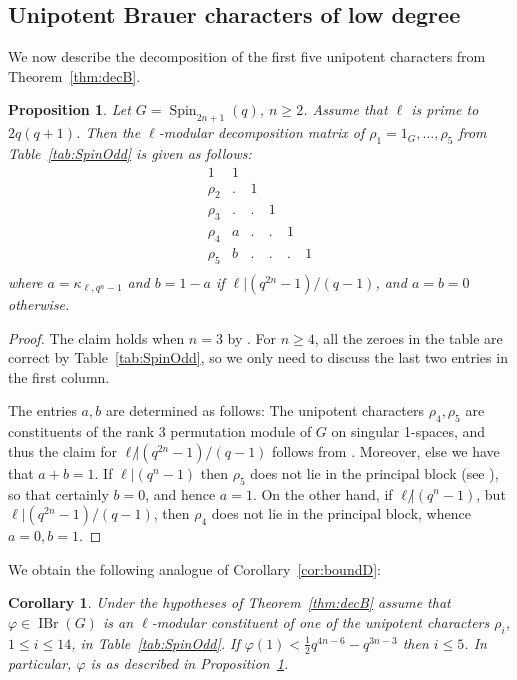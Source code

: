 \documentclass[12pt,leqno,a4paper]{amsart}
\newcommand{\IBr}{{\operatorname{IBr}}}
\newcommand{\Spin}{{\operatorname{Spin}}}
\newcommand{\hlf}{\frac{1}{2}}
\let\vhi=\varphi
\newtheorem{prop}[thm]{Proposition}
\newtheorem{cor}[thm]{Corollary}
\theoremstyle{remark}
\begin{document}
\subsection{Unipotent Brauer characters of low degree}

We now describe the decomposition of the first five unipotent characters
from Theorem~\ref{thm:decB}.

\begin{prop}   \label{prop:decmatBn}
 Let $G=\Spin_{2n+1}(q)$, $n\ge2$. Assume that  $\ell$ is prime to $2q(q+1)$.
 Then the $\ell$-modular decomposition matrix of $\rho_1=1_G,\ldots,\rho_5$
 from Table~\ref{tab:SpinOdd} is given as follows:
 \[\begin{array}{l|lllll}
       1& 1\\
  \rho_2& .& 1\\
  \rho_3& .& .& 1\\
  \rho_4& a& .& .& 1\\
  \rho_5& b& .& .& .& 1\\
 \end{array}\]
 where $a=\kappa_{\ell,q^n-1}$ and $b=1-a$ if $\ell|(q^{2n}-1)/(q-1)$, and
 $a=b=0$ otherwise.
\end{prop}

\begin{proof}
The claim holds when $n=3$ by \cite{HN14}. For $n\ge4$, all the zeroes in the
table are correct by Table~\ref{tab:SpinOdd}, so we only need to discuss the
last two entries in the first column. \par
The entries $a,b$ are determined as follows: The unipotent characters
$\rho_4,\rho_5$ are constituents of the rank 3 permutation module of $G$ on
singular 1-spaces, and thus the claim for $\ell{\not|}(q^{2n}-1)/(q-1)$
follows from \cite[Thm.~2.1]{Li86}. Moreover, else we have that $a+b=1$.
If $\ell|(q^n-1)$ then $\rho_5$ does not lie in the
principal block (see \cite[\S12]{FS}), so that certainly $b=0$, and hence $a=1$.
On the other hand, if $\ell{\not|}(q^n-1)$, but $\ell|(q^{2n}-1)/(q-1)$,
then $\rho_4$ does not lie in the principal block, whence $a=0,b=1$.
\end{proof}

We obtain the following analogue of Corollary~\ref{cor:boundD}:

\begin{cor}   \label{cor:boundB}
 Under the hypotheses of Theorem~\ref{thm:decB} assume that $\vhi\in\IBr(G)$
 is an $\ell$-modular constituent of one of the unipotent characters
 $\rho_i$, $1\le i\le 14$, in Table~\ref{tab:SpinOdd}.
 If $\vhi(1)<\hlf q^{4n-6}-q^{3n-3}$ then $i\le5$.
 In particular, $\vhi$ is as described in Proposition~\ref{prop:decmatBn}.
\end{cor}
\end{document}

